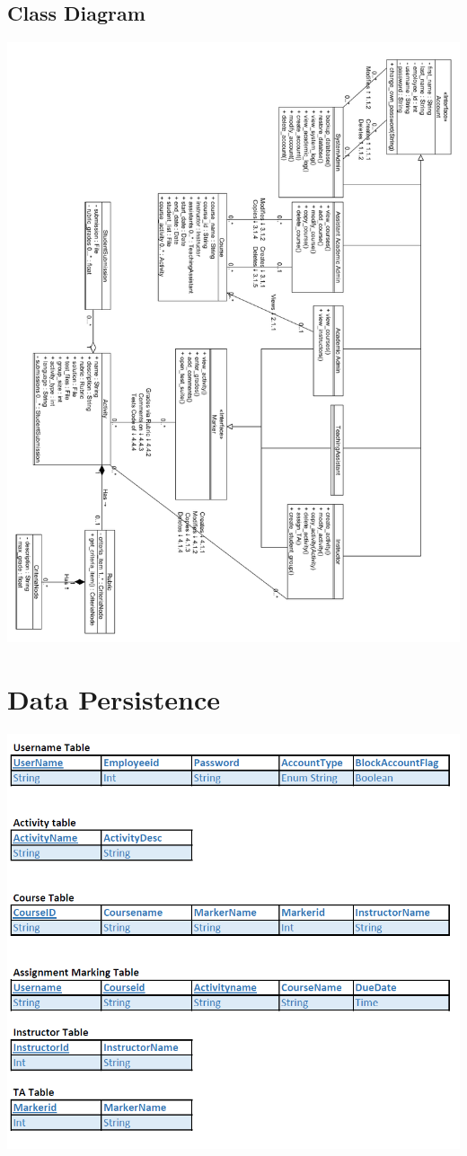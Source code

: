 \documentclass{article}
\begin{document}
\subsection{Class Diagram}
\centerline{\includegraphics[scale=0.5]{../images/Class_Diagram_Detailed}}

\section{Data Persistence}

\centerline{\includegraphics[scale=0.9]{../images/Data_Persistance.png}}
\end{document}
